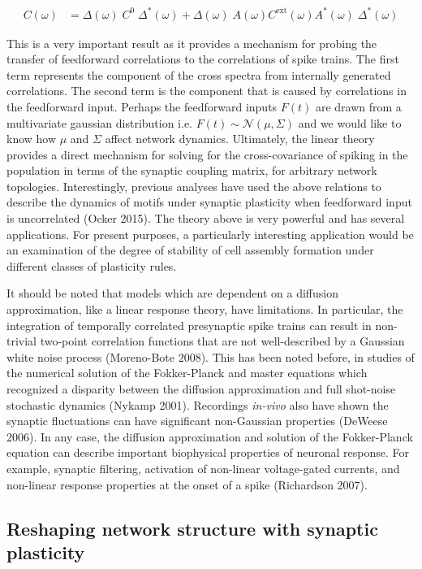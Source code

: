 \documentclass{ucetd}
\begin{document}
\begin{align}
C(\omega) &= \Delta(\omega)\;C^{0}\;\Delta^{*}(\omega) + \Delta(\omega)\;A(\omega)C^{\mathrm{ext}}(\omega)A^{*}(\omega)\;\Delta^{*}(\omega)
\end{align} 

This is a very important result as it provides a mechanism for probing the transfer of feedforward correlations to the correlations of spike trains. The first term represents the component of the cross spectra from internally generated correlations. The second term is the component that is caused by correlations in the feedforward input. Perhaps the feedforward inputs $F(t)$ are drawn from a multivariate gaussian distribution i.e. $F(t) \sim \mathcal{N}(\mu,\Sigma)$ and we would like to know how $\mu$ and $\Sigma$ affect network dynamics. Ultimately, the linear theory provides a direct mechanism for solving for the cross-covariance of spiking in the population in terms of the synaptic coupling matrix, for arbitrary network topologies. Interestingly, previous analyses have used the above relations to describe the dynamics of motifs under synaptic plasticity when feedforward input is uncorrelated (Ocker 2015). The theory above is very powerful and has several applications. For present purposes, a particularly interesting application would be an examination of the degree of stability of cell assembly formation under different classes of plasticity rules. 

It should be noted that models which are dependent on a diffusion approximation, like a linear response theory, have limitations. In particular, the integration of temporally correlated presynaptic spike trains can result in non-trivial two-point correlation functions that are not well-described by a Gaussian white noise process (Moreno-Bote 2008). This has been noted before, in studies of the numerical solution of the Fokker-Planck and master equations which recognized a disparity between the diffusion approximation and full shot-noise stochastic dynamics (Nykamp 2001). Recordings \emph{in-vivo} also have shown the synaptic fluctuations can have significant non-Gaussian properties (DeWeese 2006). In any case, the diffusion approximation and solution of the Fokker-Planck equation can describe important biophysical properties of neuronal response. For example, synaptic filtering, activation of non-linear voltage-gated currents, and non-linear response properties at the onset of a spike (Richardson 2007).

\subsection{Reshaping network structure with synaptic plasticity}
\end{document}
